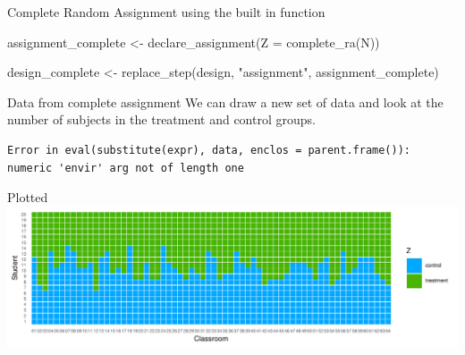\documentclass[
  11pt,
  ignorenonframetext,
]{beamer}
\newenvironment{Shaded}{\begin{snugshade}}{\end{snugshade}}
\newcommand{\AttributeTok}[1]{\textcolor[rgb]{0.40,0.45,0.13}{#1}}
\newcommand{\DecValTok}[1]{\textcolor[rgb]{0.68,0.00,0.00}{#1}}
\newcommand{\FunctionTok}[1]{\textcolor[rgb]{0.28,0.35,0.67}{#1}}
\newcommand{\NormalTok}[1]{\textcolor[rgb]{0.00,0.23,0.31}{#1}}
\newcommand{\OtherTok}[1]{\textcolor[rgb]{0.00,0.23,0.31}{#1}}
\newcommand{\SpecialCharTok}[1]{\textcolor[rgb]{0.37,0.37,0.37}{#1}}
\newcommand{\StringTok}[1]{\textcolor[rgb]{0.13,0.47,0.30}{#1}}
\begin{document}
\begin{frame}[fragile]{Complete Random Assignment using the built in
function \label{completeAss}}
\protect\hypertarget{complete-random-assignment-using-the-built-in-function}{}
\begin{Shaded}
\begin{Highlighting}[]
\NormalTok{assignment\_complete }\OtherTok{\textless{}{-}}   \FunctionTok{declare\_assignment}\NormalTok{(}\AttributeTok{Z =} \FunctionTok{complete\_ra}\NormalTok{(N))  }

\NormalTok{design\_complete }\OtherTok{\textless{}{-}} 
  \FunctionTok{replace\_step}\NormalTok{(design, }\StringTok{"assignment"}\NormalTok{, assignment\_complete)}
\end{Highlighting}
\end{Shaded}
\end{frame}

\begin{frame}[fragile]{Data from complete assignment}
\protect\hypertarget{data-from-complete-assignment}{}
We can draw a new set of data and look at the number of subjects in the
treatment and control groups.

\begin{Shaded}
\end{Shaded}

\begin{verbatim}
Error in eval(substitute(expr), data, enclos = parent.frame()): numeric 'envir' arg not of length one
\end{verbatim}
\end{frame}

\begin{frame}{Plotted}
\protect\hypertarget{plotted}{}
\includegraphics{0_lectures_files/figure-beamer/unnamed-chunk-398-1.pdf}
\end{frame}
\end{document}
